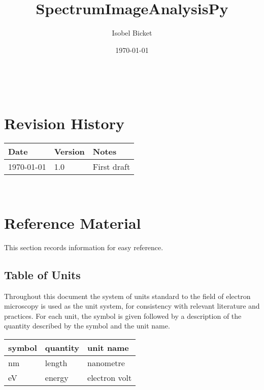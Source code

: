 \documentclass[12pt]{article}
\begin{document}

\title{SpectrumImageAnalysisPy} 
\author{Isobel Bicket}
\date{\today}
	
\maketitle

~\newpage



\section{Revision History}

\begin{tabularx}{\textwidth}{p{4cm}p{2cm}X}
	\toprule {\bf Date} & {\bf Version} & {\bf Notes}\\
	\midrule
	\today & 1.0 & First draft\\
	\bottomrule
\end{tabularx}

~\newpage

\tableofcontents

\section{Reference Material}

This section records information for easy reference.

\subsection{Table of Units}

Throughout this document the system of units standard to the field of electron microscopy is used
as the unit system, for consistency with relevant literature and practices. For each unit, the symbol is given followed by a
description of the quantity described by the symbol and the unit name.
~\newline

\renewcommand{\arraystretch}{1.2}
  \noindent \begin{tabular}{l l l} 
    \toprule		
    \textbf{symbol} & \textbf{quantity} & \textbf{unit name}\\
    \midrule 
    \si{\nano\metre} & length & nanometre\\
    \si{\electronvolt} & energy	& electron volt\\
    \bottomrule
  \end{tabular}
\end{document}
